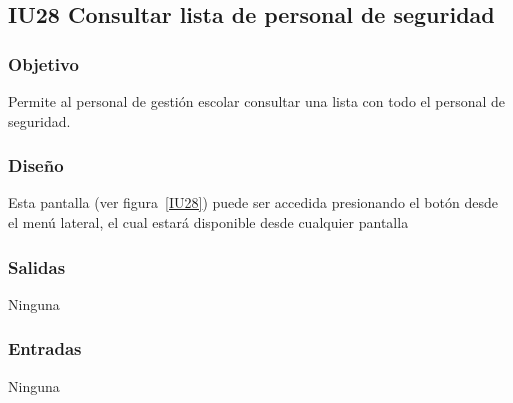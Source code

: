 
\subsection{IU28 Consultar lista de personal de seguridad}
\subsubsection{Objetivo}
   Permite al personal de gestión escolar consultar una lista con todo el personal de seguridad.
\subsubsection{Diseño}
    Esta pantalla  (ver figura~\ref{IU28}) puede ser accedida presionando el botón  desde el menú lateral, el cual estará disponible desde cualquier pantalla

\subsubsection{Salidas}
Ninguna
\subsubsection{Entradas}
Ninguna

